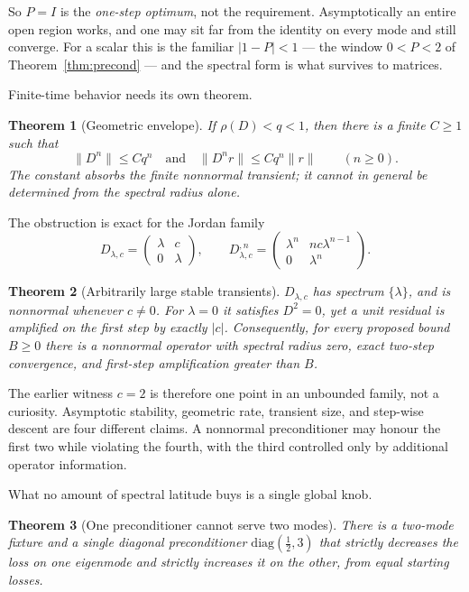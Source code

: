 \documentclass[11pt]{article}
\newtheorem{theorem}{Theorem}[section]
\begin{document}
So $P = I$ is the \emph{one-step optimum}, not the requirement. Asymptotically an entire
open region works, and one may sit far from the identity on every mode and still
converge. For a scalar this is the familiar $|1-P| < 1$ --- the window $0 < P < 2$ of
Theorem~\ref{thm:precond} --- and the spectral form is what survives to matrices.

Finite-time behavior needs its own theorem.

\begin{theorem}[Geometric envelope]\label{thm:envelope}
If $\rho(D)<q<1$, then there is a finite $C\geq1$ such that
\[
\|D^n\|\leq Cq^n\quad\text{and}\quad
\|D^nr\|\leq Cq^n\|r\|\qquad(n\geq0).
\]
The constant absorbs the finite nonnormal transient; it cannot in general be determined
from the spectral radius alone.
\end{theorem}

The obstruction is exact for the Jordan family
\[
D_{\lambda,c}=\begin{pmatrix}\lambda&c\\0&\lambda\end{pmatrix},\qquad
D_{\lambda,c}^{,n}=
\begin{pmatrix}
\lambda^n&nc\lambda^{n-1}\\0&\lambda^n
\end{pmatrix}.
\]

\begin{theorem}[Arbitrarily large stable transients]\label{thm:jordan}
$D_{\lambda,c}$ has spectrum $\{\lambda\}$, and is nonnormal whenever $c\ne0$.
For $\lambda=0$ it satisfies $D^2=0$, yet a unit residual is amplified on the first
step by exactly $|c|$. Consequently, for every proposed bound $B\geq0$ there is a
nonnormal operator with spectral radius zero, exact two-step convergence, and first-step
amplification greater than $B$.
\end{theorem}

The earlier witness $c=2$ is therefore one point in an unbounded family, not a curiosity.
Asymptotic stability, geometric rate, transient size, and step-wise descent are four
different claims. A nonnormal preconditioner may honour the first two while violating
the fourth, with the third controlled only by additional operator information.

What no amount of spectral latitude buys is a single global knob.

\begin{theorem}[One preconditioner cannot serve two modes]\label{thm:mode}
There is a two-mode fixture and a single diagonal preconditioner
$\mathrm{diag}(\tfrac12, 3)$ that strictly \emph{decreases} the loss on one eigenmode and
strictly \emph{increases} it on the other, from equal starting losses.
\end{theorem}
\end{document}
